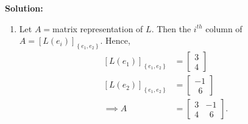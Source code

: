 \textbf{Solution:}~\begin{enumerate}
            \renewcommand{\labelenumi}{(\alph{enumi})}
        \setlength{\itemsep}{.1cm}
\item Let $A=$matrix representation of $L$. Then the $i^{th}$ column
of $A=\left[L\left(e_{i}\right)\right]_{\left\{ e_{1},e_{2}\right\} }$.
Hence,
\begin{align*}
\left[L\left(e_{1}\right)\right]_{\left\{ e_{1},e_{2}\right\} }&=\begin{bmatrix}3\\
4
\end{bmatrix} \\
\left[L\left(e_{2}\right)\right]_{\left\{ e_{1},e_{2}\right\} }&=\begin{bmatrix}-1\\
~~6
\end{bmatrix} \\
\implies A&=\begin{bmatrix}3 & -1\\
4 &~ ~6
\end{bmatrix}.
\end{align*}


\end{enumerate}
